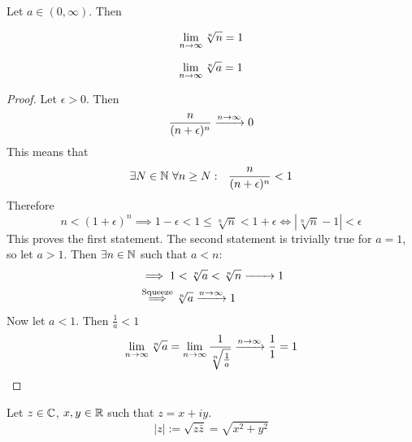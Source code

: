 \documentclass[../../script.tex]{subfiles}
\begin{document}
\begin{thm}
Let $a \in (0, \infty)$. Then

\noindent\begin{minipage}{.5\linewidth}
\[
	\lim_{n \rightarrow \infty} \sqrt[n]{n} = 1
\]
\end{minipage}
\begin{minipage}{.5\linewidth}
\[
	\lim_{n \rightarrow \infty} \sqrt[n]{a} = 1
\]
\end{minipage}
\end{thm}
\begin{proof}
Let $\epsilon > 0$. Then
\begin{equation}
	\frac{n}{(n + \epsilon)^n} \convinf 0
\end{equation}
This means that
\begin{equation}
	\exists N \in \mathbb{N} ~\forall n \ge N: ~~\frac{n}{(n + \epsilon)^n} < 1
\end{equation}
Therefore
\begin{equation}
	n < (1 + \epsilon)^n \implies 1 - \epsilon < 1 \le \sqrt[n]{n} < 1 + \epsilon \iff \left| \sqrt[n]{n} - 1 \right| < \epsilon
\end{equation}
This proves the first statement. The second statement is trivially true for $a = 1$, so let $a > 1$. Then $\exists n \in \mathbb{N}$ such that $a < n$:
\begin{align}
	&\implies 1 < \sqrt[n]{a} < \sqrt[n]{n} \conv{} 1 \\
	&\implbl{Squeeze} \sqrt[n]{a} \convinf 1
\end{align}
Now let $a < 1$. Then $\frac{1}{a} < 1$
\begin{equation}
	\limn \sqrt[n]{a} = \limn \frac{1}{\sqrt[n]{\frac{1}{a}}} \convinf \frac{1}{1} = 1
\end{equation}
\end{proof}

\begin{defi}
Let $z \in \mathbb{C}$, $x, y \in \mathbb{R}$ such that $z = x + iy$.
\[
	|z| := \sqrt{z\bar{z}} = \sqrt{x^2 + y^2}
\]
\end{defi}
\end{document}
